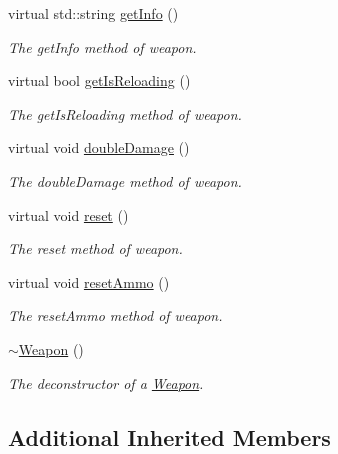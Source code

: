 \begin{DoxyCompactItemize}
virtual std\+::string \hyperlink{class_weapon_acbb83cac4f5426151954c6d4d5c66230}{get\+Info} ()
\begin{DoxyCompactList}\small\item\em The get\+Info method of weapon. \end{DoxyCompactList}\item 
virtual bool \hyperlink{class_weapon_a8126dd185bfc566566d4e4d5bdfb1f1a}{get\+Is\+Reloading} ()
\begin{DoxyCompactList}\small\item\em The get\+Is\+Reloading method of weapon. \end{DoxyCompactList}\item 
virtual void \hyperlink{class_weapon_a4e416a0635f930a322529af55b69e5ef}{double\+Damage} ()
\begin{DoxyCompactList}\small\item\em The double\+Damage method of weapon. \end{DoxyCompactList}\item 
virtual void \hyperlink{class_weapon_a126b2f1436460fafa591687b04c6b06a}{reset} ()
\begin{DoxyCompactList}\small\item\em The reset method of weapon. \end{DoxyCompactList}\item 
virtual void \hyperlink{class_weapon_a1222b1f67b198fa7f9e97a6b55eb0350}{reset\+Ammo} ()
\begin{DoxyCompactList}\small\item\em The reset\+Ammo method of weapon. \end{DoxyCompactList}\item 
\hypertarget{class_weapon_a420e7ba3d2017e6de3e93eb579cfd3fa}{\hyperlink{class_weapon_a420e7ba3d2017e6de3e93eb579cfd3fa}{$\sim$\+Weapon} ()}\label{class_weapon_a420e7ba3d2017e6de3e93eb579cfd3fa}

\begin{DoxyCompactList}\small\item\em The deconstructor of a \hyperlink{class_weapon}{Weapon}. \end{DoxyCompactList}\end{DoxyCompactItemize}
\subsection*{Additional Inherited Members}


